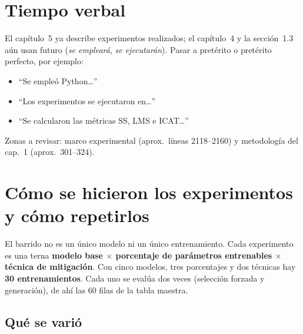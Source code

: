 \documentclass[11pt,a4paper]{article}
\begin{document}
\section{Tiempo verbal}
\label{sec:tiempo}

El capítulo~5 ya describe experimentos realizados; el capítulo~4 y la sección~1.3 aún usan futuro
(\emph{se empleará}, \emph{se ejecutarán}). Pasar a pretérito o pretérito perfecto, por ejemplo:

\begin{itemize}[nosep]
  \item ``Se empleó Python\ldots''
  \item ``Los experimentos se ejecutaron en\ldots''
  \item ``Se calcularon las métricas SS, LMS e ICAT\ldots''
\end{itemize}

Zonas a revisar: marco experimental (aprox.\ líneas 2118--2160) y metodología del cap.~1 (aprox.\ 301--324).

\section{Cómo se hicieron los experimentos y cómo repetirlos}
\label{sec:repro}

El barrido no es un único modelo ni un único entrenamiento. Cada experimento es una terna
\textbf{modelo base $\times$ porcentaje de parámetros entrenables $\times$ técnica de mitigación}.
Con cinco modelos, tres porcentajes y dos técnicas hay \textbf{30 entrenamientos}. Cada uno se evalúa
dos veces (selección forzada y generación), de ahí las 60 filas de la tabla maestra.

\subsection{Qué se varió}
\end{document}
